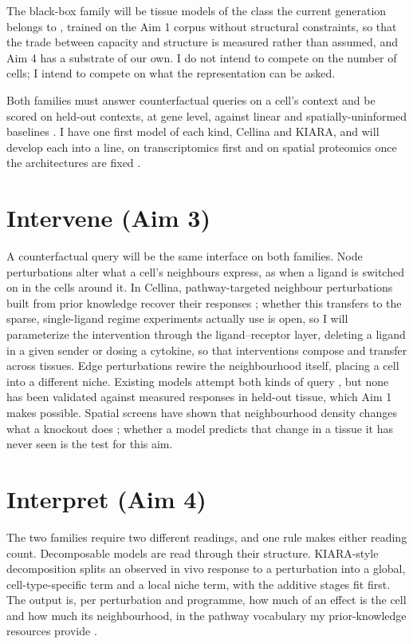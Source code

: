 \documentclass[11pt,a4paper]{article}
\begin{document}
The black-box family will be tissue models of the class the current generation belongs to \citep{birk2026terra, tejadalapuerta2025nicheformer, blampey2025novae}, trained on the Aim 1 corpus without structural constraints, so that the trade between capacity and structure is measured rather than assumed, and Aim 4 has a substrate of our own. I do not intend to compete on the number of cells; I intend to compete on what the representation can be asked.

Both families must answer counterfactual queries on a cell's context and be scored on held-out contexts, at gene level, against linear and spatially-uninformed baselines \citep{ahlmanneltze2025linear, wu2024perturbench}. I have one first model of each kind, Cellina and KIARA, and will develop each into a line, on transcriptomics first and on spatial proteomics once the architectures are fixed \citep{wenckstern2026virtues}.

\section{Intervene (Aim 3)}

A counterfactual query will be the same interface on both families. Node perturbations alter what a cell's neighbours express, as when a ligand is switched on in the cells around it. In Cellina, pathway-targeted neighbour perturbations built from prior knowledge recover their responses \citep{moeed2026cellina}; whether this transfers to the sparse, single-ligand regime experiments actually use is open, so I will parameterize the intervention through the ligand--receptor layer, deleting a ligand in a given sender or dosing a cytokine, so that interventions compose and transfer across tissues. Edge perturbations rewire the neighbourhood itself, placing a cell into a different niche. Existing models attempt both kinds of query \citep{birk2026terra, sun2025spatialprop, akbarnejad2025mintflow}, but none has been validated against measured responses in held-out tissue, which Aim 1 makes possible. Spatial screens have shown that neighbourhood density changes what a knockout does \citep{binan2025perturbfish}; whether a model predicts that change in a tissue it has never seen is the test for this aim.

\section{Interpret (Aim 4)}

The two families require two different readings, and one rule makes either reading count. Decomposable models are read through their structure. KIARA-style decomposition splits an observed in vivo response to a perturbation into a global, cell-type-specific term and a local niche term, with the additive stages fit first. The output is, per perturbation and programme, how much of an effect is the cell and how much its neighbourhood, in the pathway vocabulary my prior-knowledge resources provide \citep{turei2021omnipath, farr2024metalinksdb}.
\end{document}
